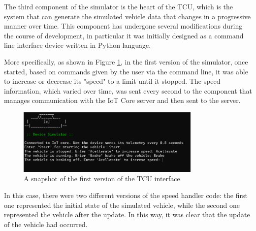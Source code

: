 The third component of the simulator is the heart of the TCU, which is the system that can generate the simulated vehicle data that changes in a progressive manner over time. This component has undergone several modifications during the course of development, in particular it was initially designed as a command line interface device written in Python language.

More specifically, as shown in Figure \ref{fig:telemetryV1}, in the first version of the simulator, once started, based on commands given by the user via the command line, it was able to increase or decrease its "speed" to a limit until it stopped. The speed information, which varied over time, was sent every second to the component that manages communication with the IoT Core server and then sent to the server.

\begin{figure}[h]  %
    \centering
    \includegraphics[width=0.8\textwidth]{images/telemetryV1.png}  %
    \caption{A snapshot of the first version of the TCU interface}
    \label{fig:telemetryV1}
\end{figure} 

In this case, there were two different versions of the speed handler code: the first one represented the initial state of the simulated vehicle, while the second one represented the vehicle after the update. In this way, it was clear that the update of the vehicle had occurred.


